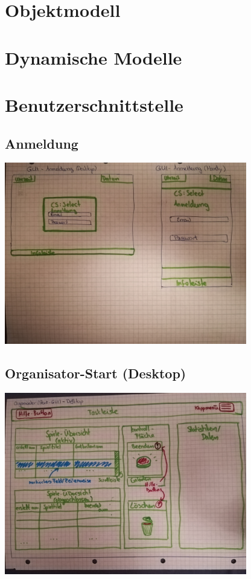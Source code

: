 \documentclass[a4paper]{scrreprt}
\begin{document}
    \section{Objektmodell}
    \section{Dynamische Modelle}
    \section{Benutzerschnittstelle}
    \subsection{Anmeldung}
    \centering
    \includegraphics[width=400px]{../pictures/1_Anmeldung.jpg}
    \subsection{Organisator-Start (Desktop)}
    \centering
    \includegraphics[width=400px]{../pictures/2_Organisator.jpg}
\end{document}
